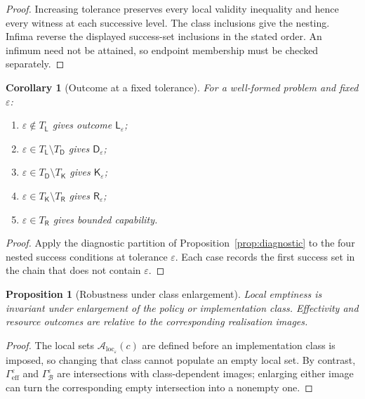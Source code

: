 \documentclass[11pt]{article}
\theoremstyle{plain}
\newtheorem{proposition}[theorem]{Proposition}
\newtheorem{corollary}[theorem]{Corollary}
\theoremstyle{definition}
\theoremstyle{remark}
\newcommand{\LocalAdm}{\mathcal{A}_{\mathrm{loc}}}
\newcommand{\eps}{\varepsilon}
\begin{document}
\begin{proof}
Increasing tolerance preserves every local validity inequality and hence every
witness at each successive level. The class inclusions give the nesting. Infima
reverse the displayed success-set inclusions in the stated order. An infimum
need not be attained, so endpoint membership must be checked separately.
\end{proof}

\begin{corollary}[Outcome at a fixed tolerance]\label{cor:tolerance-outcome}
For a well-formed problem and fixed $\eps$:
\begin{enumerate}[label=(\roman*)]
\item $\eps\notin T_{\mathsf L}$ gives outcome $\mathsf L_\eps$;
\item $\eps\in T_{\mathsf L}\setminus T_{\mathsf D}$ gives $\mathsf D_\eps$;
\item $\eps\in T_{\mathsf D}\setminus T_{\mathsf K}$ gives $\mathsf K_\eps$;
\item $\eps\in T_{\mathsf K}\setminus T_{\mathsf R}$ gives $\mathsf R_\eps$;
\item $\eps\in T_{\mathsf R}$ gives bounded capability.
\end{enumerate}
\end{corollary}

\begin{proof}
Apply the diagnostic partition of Proposition~\ref{prop:diagnostic} to the four
nested success conditions at tolerance $\eps$. Each case records the first
success set in the chain that does not contain $\eps$.
\end{proof}

\begin{proposition}[Robustness under class enlargement]\label{prop:robust}
Local emptiness is invariant under enlargement of the policy or implementation
class. Effectivity and resource outcomes are relative to the corresponding
realisation images.
\end{proposition}

\begin{proof}
The local sets $\LocalAdm_\eps(c)$ are defined before an implementation class is
imposed, so changing that class cannot populate an empty local set. By contrast,
$\Gamma_{\mathrm{eff}}^\eps$ and $\Gamma_{\mathcal B}^\eps$ are intersections
with class-dependent images; enlarging either image can turn the corresponding
empty intersection into a nonempty one.
\end{proof}
\end{document}
